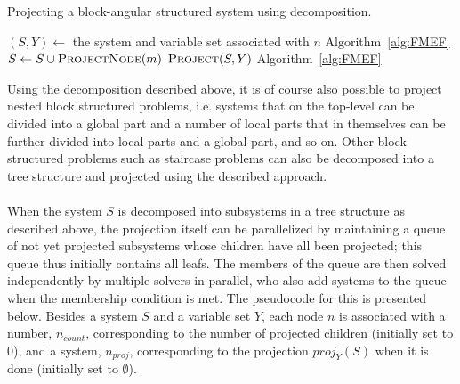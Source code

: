 \documentclass[citeauthoryear]{llncs}
\newcommand{\mi}{\mathit}
\begin{document}
\begin{algorithm}
\caption{{Projecting a block-angular structured system using decomposition.}}
\label{alg:decomp}
\begin{algorithmic}
	\State $(S,Y)\gets$ the system and variable set associated with $n$
		\State \Return {}\Comment Algorithm~\ref{alg:FMEF}
	\Else
			\State $S \gets S\cup \Call{ProjectNode}{m}$ 
		\EndFor
		\State \Return $\Call{Project}{S, Y}$ \Comment Algorithm~\ref{alg:FMEF}
	\EndIf
\EndFunction
\end{algorithmic}
\end{algorithm}
%

\noindent Using the decomposition described above, it is of course also possible to project nested block structured problems, i.e. systems that on the top-level can be divided into a global part and a number of local parts that in themselves can be further divided into local parts and a global part, and so on.  
Other block structured problems such as staircase problems can also be decomposed into a tree structure and projected using the described approach. 
\\\\
When the system $S$ is decomposed into subsystems in a tree structure as described above, the projection itself can be parallelized by maintaining a queue of not yet projected subsystems whose children have all been projected; this queue thus initially contains all leafs. 
The members of the queue are then solved independently by multiple solvers in parallel, who also add systems to the queue when the membership condition is met.
The pseudocode for this is presented below. Besides a system $S$ and a variable set $Y$, each node $n$ is associated with a number, $n_{count}$, corresponding to the number of projected children (initially set to $0$), and a system, $n_{proj}$, corresponding to the projection $\mi{proj}_Y(S)$ when it is done (initially set to $\emptyset$). 
\vspace{1mm}
\end{document}
